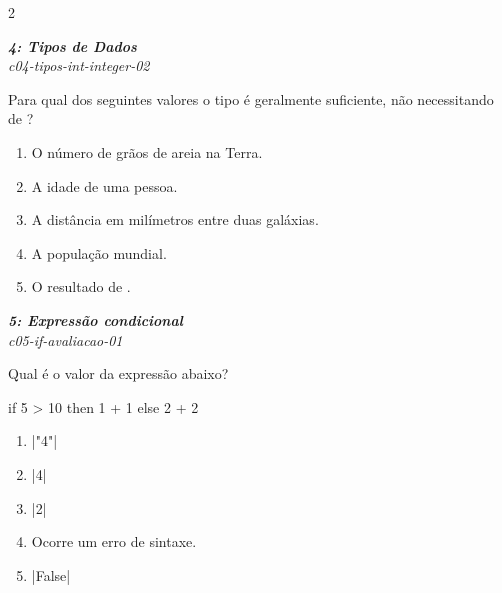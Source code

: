 \documentclass[a4paper,10pt,brazil]{article}
\begin{document}
\begin{multicols}{2}
\begin{enumerate}
\end{enumerate}

\begin{flushright}
  \footnotesize
  \textit{\textbf{4: Tipos de Dados}}\\
  \textit{c04-tipos-int-integer-02}\\

\end{flushright}
Para qual dos seguintes valores o tipo  é geralmente suficiente, não necessitando de ?

\begin{enumerate}
  \item O número de grãos de areia na Terra.

  \item A idade de uma pessoa.

  \item A distância em milímetros entre duas galáxias.

  \item A população mundial.

  \item O resultado de .


\end{enumerate}

\begin{flushright}
  \footnotesize
  \textit{\textbf{5: Expressão condicional}}\\
  \textit{c05-if-avaliacao-01}\\

\end{flushright}
Qual é o valor da expressão abaixo?
\begin{haskellcode}
if 5 > 10 then 1 + 1 else 2 + 2
\end{haskellcode}

\begin{enumerate}
  \item \haskellinline|"4"|

  \item \haskellinline|4|

  \item \haskellinline|2|

  \item Ocorre um erro de sintaxe.

  \item \haskellinline|False|



\end{enumerate}
\end{multicols}
\end{document}
